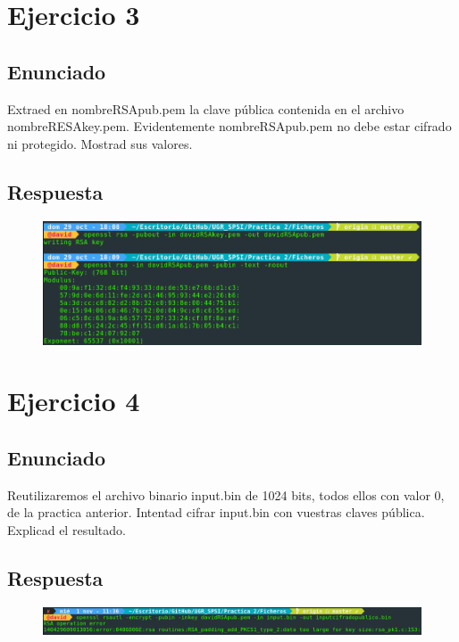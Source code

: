 \documentclass[10pt,a4paper,spanish]{report}
\begin{document}
\chapter{Ejercicio 3}

\section{Enunciado}
\noindent
Extraed en nombreRSApub.pem la clave pública contenida en el archivo nombreRESAkey.pem. Evidentemente nombreRSApub.pem no debe estar cifrado ni protegido. Mostrad sus valores.

\section{Respuesta}
\noindent

\begin{figure}[!hbp]
 \centering  \includegraphics[width=1\textwidth]{./Imagenes/4.png}
\end{figure}


\chapter{Ejercicio 4}

\section{Enunciado}
\noindent
Reutilizaremos el archivo binario input.bin de 1024 bits, todos ellos con valor 0, de la practica anterior. Intentad cifrar input.bin con vuestras claves pública. Explicad el resultado.

\section{Respuesta}
\noindent
\begin{figure}[!hbp]
 \centering  \includegraphics[width=1\textwidth]{./Imagenes/5.png}
\end{figure}
\end{document}
